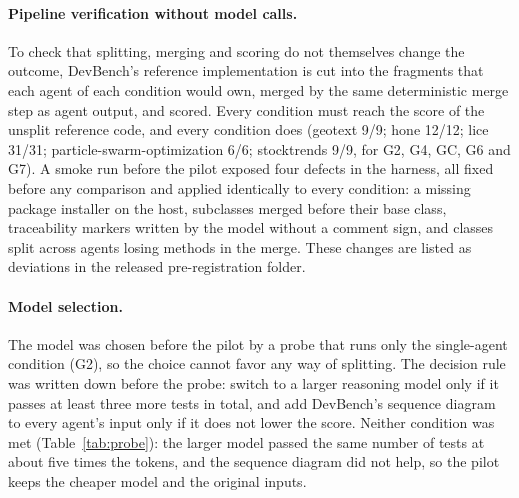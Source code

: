 \paragraph{Pipeline verification without model calls.} To check that splitting, merging and scoring do not themselves change the outcome, DevBench's reference implementation is cut into the fragments that each agent of each condition would own, merged by the same deterministic merge step as agent output, and scored. Every condition must reach the score of the unsplit reference code, and every condition does (geotext 9/9; hone 12/12; lice 31/31; particle-swarm-optimization 6/6; stocktrends 9/9, for G2, G4, GC, G6 and G7). A smoke run before the pilot exposed four defects in the harness, all fixed before any comparison and applied identically to every condition: a missing package installer on the host, subclasses merged before their base class, traceability markers written by the model without a comment sign, and classes split across agents losing methods in the merge. These changes are listed as deviations in the released pre-registration folder.

\paragraph{Model selection.} The model was chosen before the pilot by a probe that runs only the single-agent condition (G2), so the choice cannot favor any way of splitting. The decision rule was written down before the probe: switch to a larger reasoning model only if it passes at least three more tests in total, and add DevBench's sequence diagram to every agent's input only if it does not lower the score. Neither condition was met (Table~\ref{tab:probe}): the larger model passed the same number of tests at about five times the tokens, and the sequence diagram did not help, so the pilot keeps the cheaper model and the original inputs.



